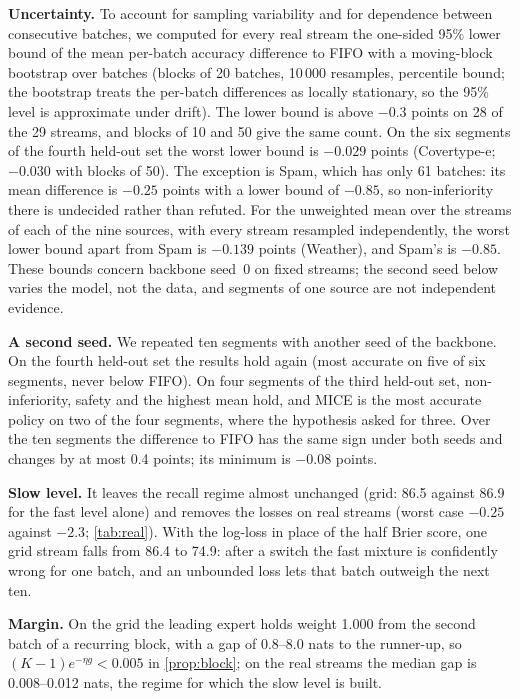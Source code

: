 \documentclass[11pt]{article}
\theoremstyle{plain}
\theoremstyle{definition}
\theoremstyle{remark}
\newcommand{\method}{\textsc{MICE}}   %
\begin{document}
\textbf{Uncertainty.} To account for
sampling variability and for dependence between consecutive batches, we computed for every real stream the
one-sided 95\% lower bound of the mean per-batch accuracy difference to FIFO with a moving-block bootstrap over
batches (blocks of 20 batches, 10\,000 resamples, percentile bound; the bootstrap treats the per-batch differences as
locally stationary, so the 95\% level is approximate under drift). The lower bound is above $-0.3$ points on 28 of
the 29 streams, and blocks of 10 and 50 give the same count. On the six segments of the fourth held-out set the
worst lower bound is $-0.029$ points (Covertype-e; $-0.030$ with blocks of 50). The
exception is Spam, which has only 61 batches: its mean difference is $-0.25$ points with a lower bound of $-0.85$, so
non-inferiority there is undecided rather than refuted. For the unweighted mean over the streams of each of the nine
sources, with every stream resampled independently, the worst lower bound apart from Spam is $-0.139$ points
(Weather), and Spam's is $-0.85$. These
bounds concern backbone seed~0 on fixed streams; the second seed below varies the model, not the data, and segments
of one source are not independent evidence.

\textbf{A second seed.} We repeated ten segments with another seed of the backbone. On the fourth held-out set the results hold again (most accurate on five of six segments, never below
FIFO). On four segments of the third held-out set, non-inferiority, safety and the highest mean hold, and \method{}
is the most accurate policy on two of the four segments, where the hypothesis asked for three. Over the ten
segments the difference to FIFO has the same sign under both seeds and changes by at most 0.4 points; its minimum
is $-0.08$ points.

\textbf{Slow level.} It leaves the recall regime almost
unchanged (grid: 86.5 against 86.9 for the fast level alone) and removes the losses on real streams (worst case
$-0.25$ against $-2.3$; \cref{tab:real}). With the log-loss in place of the half Brier score, one grid stream falls
from 86.4 to 74.9: after a switch the fast mixture is confidently wrong for one batch, and an unbounded loss lets
that batch outweigh the next ten.

\textbf{Margin.} On the grid the
leading expert holds weight 1.000 from the second batch of a recurring block, with a gap of 0.8--8.0 nats to the
runner-up, so $(K-1)e^{-\eta g}<0.005$ in \cref{prop:block}; on the real streams the median gap is 0.008--0.012
nats, the regime for which the slow level is built.
\end{document}
